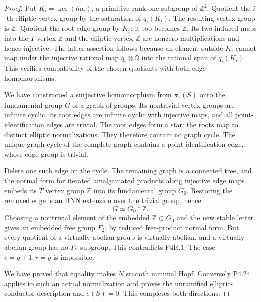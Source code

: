 \begin{proof}
Put \(K_i=\ker(h a_i)\), a primitive rank-one subgroup of
\(\mathbb Z^2\). Quotient the \(i\)-th elliptic vertex group by the
saturation of \(q_i(K_i)\). The resulting vertex group is \(\mathbb Z\).
Quotient the root edge group by \(K_i\); it too becomes \(\mathbb Z\).
Its two induced maps into the \(T\) vertex \(\mathbb Z\) and the elliptic
vertex \(\mathbb Z\) are nonzero multiplications and hence injective.
The latter assertion follows because an element outside \(K_i\) cannot
map under the injective rational map \(q_i\otimes\mathbb Q\) into the
rational span of \(q_i(K_i)\). This verifies compatibility of the chosen
quotients with both edge homomorphisms.

We have constructed a surjective homomorphism from \(\pi_1(S)\) onto the
fundamental group \(G\) of a graph of groups. Its nontrivial vertex groups
are infinite cyclic, its root edges are infinite cyclic with injective
maps, and all point-identification edges are trivial. The root edges
form a star: the roots map to distinct elliptic normalizations. They
therefore contain no graph cycle. The unique graph cycle of the complete
graph contains a point-identification edge, whose edge group is trivial.

Delete one such edge on the cycle. The remaining graph is a connected
tree, and the normal form for iterated amalgamated products along
injective edge maps embeds its \(T\) vertex group \(\mathbb Z\) into its
fundamental group \(G_0\). Restoring the removed edge is an HNN extension
over the trivial group, hence
\[
 G\simeq G_0*\mathbb Z.
\]
Choosing a nontrivial element of the embedded \(\mathbb Z\subset G_0\)
and the new stable letter gives an embedded free group \(F_2\), by reduced
free-product normal form. But every quotient of a virtually abelian group
is virtually abelian, and a virtually abelian group has no \(F_2\)
subgroup. This contradicts P4R.1. The case \(c=g+1,r=g\) is impossible.

We have proved that equality makes \(N\) smooth minimal Hopf. Conversely
P4.24 applies to such an actual normalization and proves the unramified
elliptic-conductor description and \(e(S)=0\). This completes both
directions.
\end{proof}
